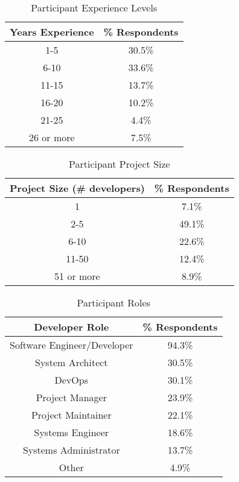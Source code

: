 \begin{table}[!t]
\renewcommand{\arraystretch}{1.3}
\caption{Participant Experience Levels}
\label{exp_levels}
\centering
\begin{tabular}{|c||c|}
\hline
Years Experience & \% Respondents\\
\hline
1-5 & 30.5\%\\
6-10 & 33.6\%\\
11-15 & 13.7\%\\
16-20 & 10.2\%\\
21-25 & 4.4\%\\
26 or more & 7.5\%\\
\hline
\end{tabular}
\end{table}

\begin{table}[!t]
\renewcommand{\arraystretch}{1.3}
\caption{Participant Project Size}
\label{project_size}
\centering
\begin{tabular}{|c||c|}
\hline
Project Size (\# developers) & \% Respondents\\
\hline
1 & 7.1\%\\
2-5 & 49.1\%\\
6-10 & 22.6\%\\
11-50 & 12.4\%\\
51 or more & 8.9\%\\
\hline
\end{tabular}
\end{table}

\begin{table}[!t]
\renewcommand{\arraystretch}{1.3}
\caption{Participant Roles}
\label{roles_table}
\centering
\begin{tabular}{|c||c|}
\hline
Developer Role & \% Respondents\\
\hline
Software Engineer/Developer & 94.3\%\\
System Architect & 30.5\%\\
DevOps & 30.1\%\\
Project Manager & 23.9\%\\
Project Maintainer & 22.1\%\\
Systems Engineer & 18.6\%\\
Systems Administrator & 13.7\%\\
Other & 4.9\%\\
\hline
\end{tabular}
\end{table}